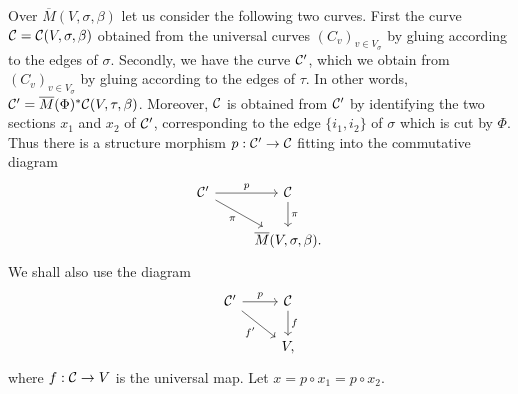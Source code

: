 \documentclass{article}
\newcommand{\upst}{^{\ast}}
\newcommand{\cC}{{\cal C}}
\newcommand{\comp}{\mathbin{{\scriptstyle\circ}}}
\newcommand{\ol}{\overline}
\newcommand{\rdiag}[1]%
       {\makebox[0cm]{$\phantom{\scriptstyle#1}\downarrow{\scriptstyle#1}$}}
\newcommand{\sediag}[1]%
       {\makebox[0cm]{${\scriptstyle#1}\searrow\phantom{\scriptstyle#1}$}}
\newcommand{\comtri}[6]{%
\begin{array}{ccc}
#1 & \stackrel{#2}{\longrightarrow} & #3         \\
   & \sediag{#4}                    & \rdiag{#5} \\
   &                                & #6
\end{array}}
\begin{document}
Over $\ol{M}(V,\sigma,\beta)$ let us consider the following two
curves. First the curve $\cC=\cC(V,\sigma,\beta)$ obtained from the
universal curves $(C_v)_{v\in V_{\sigma}}$ by gluing according to the
edges of $\sigma$. Secondly, we have the curve $\cC'$, which we obtain
from $(C_v)_{v\in V_{\sigma}}$ by gluing according to the
edges of $\tau$. In other words,
$\cC'=\ol{M}(\Phi)\upst\cC(V,\tau,\beta)$. Moreover, $\cC$ is obtained
from $\cC'$ by identifying the two sections $x_1$ and $x_2$ of $\cC'$,
corresponding to the edge $\{i_1,i_2\}$ of $\sigma$ which is cut by
$\Phi$. Thus there is a structure morphism $p:\cC'\to\cC$ fitting into
the commutative diagram
\[\begin{tikzcd}
\cC' \rar["p"] \drar["\pi"'] & \cC \dar["\pi"] \\
& \ol{M}(V,\sigma,\beta).
\end{tikzcd}\]
We shall also use the diagram
\[\begin{tikzcd}
\cC' \rar["p"] \drar["f'"'] & \cC \dar["f"] \\
& V,
\end{tikzcd}\]
where $f:\cC\to V$ is the universal map. Let $x=p\comp x_1=p\comp
x_2$.
\end{document}
